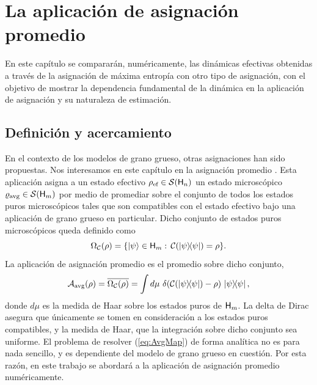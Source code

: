 \chapter{La aplicación de asignación promedio}

En este capítulo se compararán, numéricamente, las dinámicas efectivas obtenidas a través de la asignación de máxima entropía con otro tipo de asignación, con el objetivo de mostrar la dependencia fundamental de la dinámica en la aplicación de asignación y su naturaleza de estimación.

\section{Definición y acercamiento}

En el contexto de los modelos de grano grueso, otras asignaciones han sido propuestas. Nos interesamos en este capítulo en la asignación promedio \cite{Macro-To-Micro}. Esta aplicación asigna a un estado efectivo $\rho_{\text{ef}} \in \mathcal{S}({\sf H}_{n})$ un estado microscópico $\varrho_{\text{avg}} \in \mathcal{S}({\sf H}_{m})$ por medio de promediar sobre el conjunto de todos los estados puros microscópicos tales que son compatibles con el estado efectivo bajo una aplicación de grano grueso en particular. Dicho conjunto de estados puros microscópicos queda definido como
\begin{equation}\label{eq:Omega}
    \Omega_{\mcC}(\rho) = \{\ket{\psi}\in\hilbert_{m}:\, \mcC(\dyad{\psi}) = \rho   \}.
\end{equation}
La aplicación de asignación promedio es el promedio sobre dicho conjunto, \ie 
\begin{equation}\label{eq:AvgMap}
    \mcA_{\avg}(\rho) = \overline{\Omega_{\mcC}(\rho)} = \int d \mu\,\, \delta(\mcC(\dyad{\psi})-\rho)\,\dyad{\psi},
\end{equation}
donde $d\mu$ es la medida de Haar sobre los estados puros de ${\sf H}_{m}$. La delta de Dirac asegura que únicamente se tomen en consideración a los estados puros compatibles, y la medida de Haar, que la integración sobre dicho conjunto sea uniforme. El problema de resolver (\ref{eq:AvgMap}) de forma analítica no es para nada sencillo, y es dependiente del modelo de grano grueso en cuestión. Por esta razón, en este trabajo se abordará a la aplicación de asignación promedio numéricamente.

